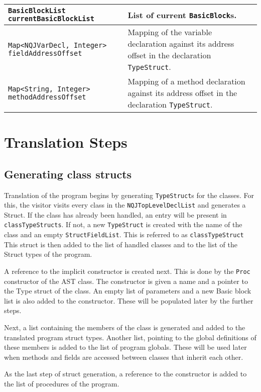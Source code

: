\documentclass[]{tukportfolio}
\begin{document}
\begin{center}
\begin{longtable}{| m{}|m{}|}
		\hline
		\lstinline|BasicBlockList currentBasicBlockList| & List of current \lstinline|BasicBlock|s.\\
		\hline
		\lstinline|Map<NQJVarDecl, Integer> fieldAddressOffset| & Mapping of the variable declaration against its address offset in the declaration \lstinline|TypeStruct|.\\
		\hline
		\label{methodAddressOffset}
		\lstinline|Map<String, Integer> methodAddressOffset| & Mapping of a method declaration against its address offset in the declaration \lstinline|TypeStruct|.\\
		\hline
	\end{longtable}
\end{center}

\section{Translation Steps}
\subsection{Generating class structs}\label{step1}
	
	Translation of the program begins by generating \lstinline|TypeStruct|s for the classes. For this, the visitor visits every class in the \lstinline|NQJTopLevelDeclList| and generates a Struct. If the class has already been handled, an entry will be present in \lstinline|classTypeStructs|. If not, a new \lstinline|TypeStruct| is created with the name of the class and an empty \lstinline|StructFieldList|. This is referred to as \lstinline|classTypeStruct|\label{classTypeStruct} This struct is then added to the list of handled classes and to the list of the Struct types of the program. 
	
	A reference to the implicit constructor is created next. This is done by the \lstinline|Proc| constructor of the AST class. The constructor is given a name and a pointer to the Type struct of the class. An empty list of parameters and a new Basic block list is also added to the constructor. These will be populated later by the further steps. 
	
	Next, a list containing the members of the class is generated and added to the translated program struct types. Another list, pointing to the global definitions of these members is added to the list of program globals. These will be used later when methods and fields are accessed between classes that inherit each other.
	
	As the last step of struct generation, a reference to the constructor is added to the list of procedures of the program.
	
\end{document}
